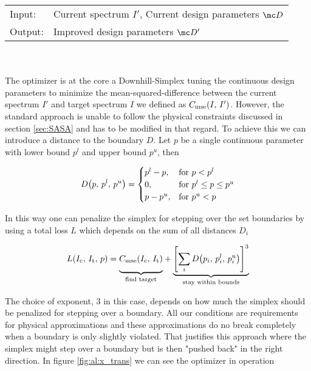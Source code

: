 \begin{tabular}{ll}
    \toprule
    Input: &
    Current spectrum $I'$, 
    Current design parameters $\mc D$\\
    Output: & 
    Improved design parameters $\mc D'$\\
    \bottomrule
\end{tabular}
\\
\\
The optimizer is at the core a Downhill-Simplex \cite{Nelder1965} tuning the continuous design parameters to minimize the mean-squared-difference between the current spectrum $I'$ and target spectrum $I$ we defined as 
$C_{\mathrm{mse}}\qty(I, \, I')$.
However, the standard approach is unable to follow the physical constraints discussed in section \ref{sec:SASA} and has to be modified in that regard. To achieve this we can introduce a distance to the boundary $D$. Let $p$ be a single continuous parameter with lower bound $p^l$ and upper bound $p^u$, then

\begin{equation}
    D\qty(p, \, p^l, \, p^u) =
    \begin{cases}
        p^l - p, & \text{for } p < p^l\\
        0, & \text{for } p^l \leq p \leq p^u\\
        p - p^u, & \text{for } p^u < p
    \end{cases}
\end{equation}

\noindent
In this way one can penalize the simplex for stepping over the set boundaries by using a total loss $L$ which depends on the sum of all distances $D_i$

\begin{equation}
    L(I_\s{c}, \,I_\s{t}, \,p) =
    {\underbrace{%
    \vphantom{ \left(\frac{a^{0.3}}{b}\right) }
    C_\s{mse}(I_\s{c}, \, I_\s{t})}_{\text{find target}}}
    +
    {\underbrace{%
    \qty[\sum_i D\qty(p_i, \, p_i^l, \, p_i^u)]^3
    }_{\text{stay within bounds}}}\\
\end{equation}

The choice of exponent, 3 in this case, depends on how much the simplex should be penalized for stepping over a boundary. All our conditions are requirements for physical approximations and these approximations do no break completely when a boundary is only slightly violated. That justifies this approach where the simplex might step over a boundary but is then "pushed back" in the right direction. In figure \ref{fig:al:x_trans} we can see the optimizer in operation
\\

